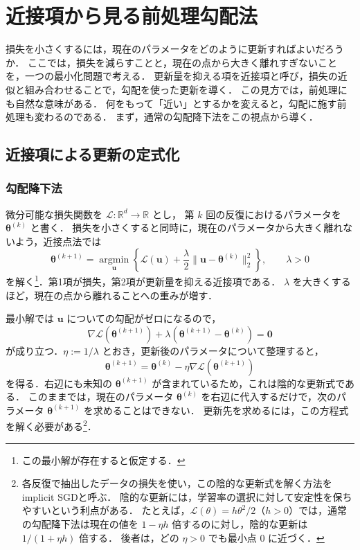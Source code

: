 \documentclass[../main.tex]{subfiles}
\begin{document}
\ifSubfilesClassLoaded{\setcounter{chapter}{1}}{}

\chapter{近接項から見る前処理勾配法}

損失を小さくするには，現在のパラメータをどのように更新すればよいだろうか．
ここでは，損失を減らすことと，現在の点から大きく離れすぎないことを，一つの最小化問題で考える．
更新量を抑える項を近接項と呼び，損失の近似と組み合わせることで，勾配を使った更新を導く．
この見方では，前処理にも自然な意味がある．
何をもって「近い」とするかを変えると，勾配に施す前処理も変わるのである．
まず，通常の勾配降下法をこの視点から導く．

\section{近接項による更新の定式化}

\subsection{勾配降下法}

微分可能な損失関数を $\mathcal{L}\colon\mathbb{R}^d\to\mathbb{R}$ とし，
第 $k$ 回の反復におけるパラメータを $\bm{\theta}^{(k)}$ と書く．
損失を小さくすると同時に，現在のパラメータから大きく離れないよう，近接点法では
\begin{equation}
  \bm{\theta}^{(k+1)}=\underset{\bm{u}}{\operatorname{argmin}}
  \left\{\mathcal{L}(\bm{u})
  +\frac{\lambda}{2}\|\bm{u}-\bm{\theta}^{(k)}\|_2^2\right\},
  \qquad\lambda>0
  \label{eq:md-proximal-point}
\end{equation}
を解く\footnote{この最小解が存在すると仮定する．}．第1項が損失，第2項が更新量を抑える近接項である．
$\lambda$ を大きくするほど，現在の点から離れることへの重みが増す．

最小解では $\bm{u}$ についての勾配がゼロになるので，
\begin{equation}
  \nabla\mathcal{L}(\bm{\theta}^{(k+1)})
  +\lambda(\bm{\theta}^{(k+1)}-\bm{\theta}^{(k)})=\bm{0}
\end{equation}
が成り立つ．$\eta:=1/\lambda$ とおき，更新後のパラメータについて整理すると，
\begin{equation}
  \bm{\theta}^{(k+1)}=\bm{\theta}^{(k)}
  -\eta\nabla\mathcal{L}(\bm{\theta}^{(k+1)})
  \label{eq:md-implicit-gradient}
\end{equation}
を得る．右辺にも未知の $\bm{\theta}^{(k+1)}$ が含まれているため，これは陰的な更新式である．
このままでは，現在のパラメータ $\bm{\theta}^{(k)}$ を右辺に代入するだけで，次のパラメータ $\bm{\theta}^{(k+1)}$ を求めることはできない．
更新先を求めるには，この方程式を解く必要がある\footnote{各反復で抽出したデータの損失を使い，この陰的な更新式を解く方法をimplicit SGDと呼ぶ．
陰的な更新には，学習率の選択に対して安定性を保ちやすいという利点がある\cite{toulis2016stability}．
たとえば，$\mathcal{L}(\theta)=h\theta^2/2$（$h>0$）では，通常の勾配降下法は現在の値を $1-\eta h$ 倍するのに対し，陰的な更新は $1/(1+\eta h)$ 倍する．
後者は，どの $\eta>0$ でも最小点 $0$ に近づく．}．
\end{document}
